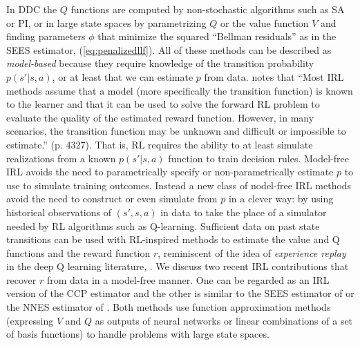 In DDC the $Q$ functions are computed  by non-stochastic algorithms such as SA or PI, or in large state spaces
by parametrizing $Q$ or the value function $V$ and finding parameters $\phi$ that minimize the squared ``Bellman
residuals'' as in the SEES estimator, (\ref{eq:penalizedllf}). All of these methods can be described as {\it model-based\/}
because they require knowledge of the transition probability $p(s'|s,a)$, or at least that we can estimate $p$ from
data. \citet{adams:2022} notes that ``Most IRL methods assume that a model (more specifically the transition function) is known
to the learner and that it can be used to solve the forward RL problem to evaluate
the quality of the estimated reward function. However, in many scenarios, the transition
function may be unknown and difficult or impossible to estimate.'' (p. 4327). That is, RL requires the ability to at least
simulate realizations from a known $p(s'|s,a)$ function to train decision rules.
Model-free IRL avoids the need to parametrically specify or non-parametrically estimate $p$ to use to simulate training outcomes.
Instead a new class of nodel-free IRL methods avoid the need to construct or even simulate from
$p$  in a clever way: by using historical observations of $(s',s,a)$ in data to take the place of  a 
simulator needed by RL algorithms such as Q-learning. Sufficient data on past state transitions 
can be used with RL-inspired methods to estimate the value and Q functions and the reward function $r$, reminiscent of the idea
of {\it experience replay\/} in the deep Q learning literature, \citet{mnih:2015}.
We discuss two recent IRL contributions that recover $r$ from data in a model-free manner. One can be regarded as an IRL version of the CCP estimator and
the other is similar to the SEES estimator of \citet{LuoSang:2024} or the NNES estimator of \citet{Nguyen:2025}.  Both 
methods use function approximation methods (expressing $V$ and $Q$ as outputs of neural networks or
linear combinations of a set of basis functions) to handle problems with large 
state spaces.

